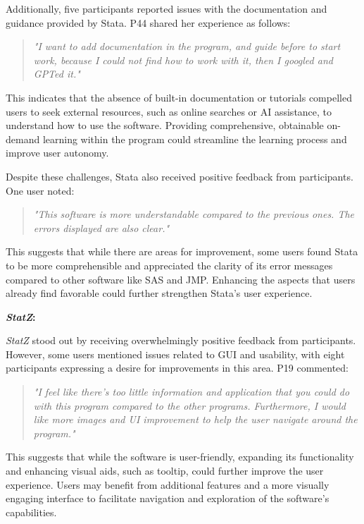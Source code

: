 \documentclass{article}
\begin{document}
Additionally, five participants reported issues with the documentation and guidance provided by Stata. P44 shared her experience as follows:

\begin{quote} \emph{"I want to add documentation in the program, and guide before to start work, because I could not find how to work with it, then I googled and GPTed it." } \end{quote}

This indicates that the absence of built-in documentation or tutorials compelled users to seek external resources, such as online searches or AI assistance, to understand how to use the software. Providing comprehensive, obtainable on-demand learning within the program could streamline the learning process and improve user autonomy.

Despite these challenges, Stata also received positive feedback from participants. One user noted:

\begin{quote} \emph{"This software is more understandable compared to the previous ones. The errors displayed are also clear." } \end{quote}

This suggests that while there are areas for improvement, some users found Stata to be more comprehensible and appreciated the clarity of its error messages compared to other software like SAS and JMP. Enhancing the aspects that users already find favorable could further strengthen Stata's user experience.

\textbf{\textit{StatZ}:}

\textit{StatZ} stood out by receiving overwhelmingly positive feedback from participants. However, some users mentioned issues related to GUI and usability, with eight participants expressing a desire for improvements in this area. P19  commented:

\begin{quote} \emph{"I feel like there's too little information and application that you could do with this program compared to the other programs. Furthermore, I would like more images and UI improvement to help the user navigate around the program." } \end{quote}

This suggests that while the software is user-friendly, expanding its functionality and enhancing visual aids, such as tooltip, could further improve the user experience. Users may benefit from additional features and a more visually engaging interface to facilitate navigation and exploration of the software's capabilities.
\end{document}
